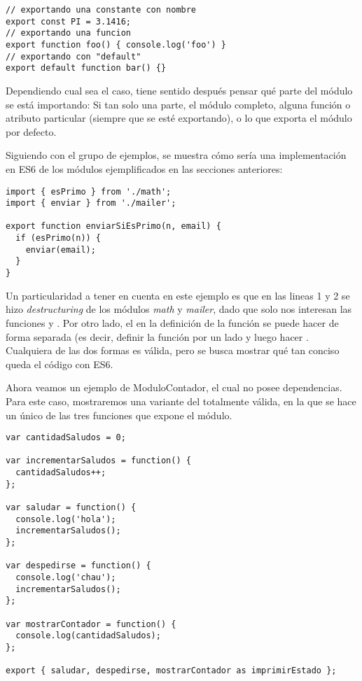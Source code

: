 \begin{lstlisting}[title={Algunos ejemplos de \code{export}}]
// exportando una constante con nombre
export const PI = 3.1416;
// exportando una funcion
export function foo() { console.log('foo') }
// exportando con "default"
export default function bar() {}
\end{lstlisting}

Dependiendo cual sea el caso, tiene sentido después pensar qué parte del módulo se está importando: Si tan solo una parte, el módulo completo, alguna función o atributo particular (siempre que se esté exportando), o lo que exporta el módulo por defecto.

Siguiendo con el grupo de ejemplos, se muestra cómo sería una implementación en ES6 de los módulos ejemplificados en las secciones anteriores:

\begin{lstlisting}[title={Ejemplo de módulo en ES6}]
import { esPrimo } from './math';
import { enviar } from './mailer';

export function enviarSiEsPrimo(n, email) {
  if (esPrimo(n)) {
    enviar(email);
  }
}
\end{lstlisting}

Un particularidad a tener en cuenta en este ejemplo es que en las lineas 1 y 2 se hizo \textit{destructuring} de los módulos \textit{math} y \textit{mailer}, dado que solo nos interesan las funciones  y . Por otro lado, el  en la definición de la función se puede hacer de forma separada (es decir, definir la función por un lado y luego hacer . Cualquiera de las dos formas es válida, pero se busca mostrar qué tan conciso queda el código con ES6.

Ahora veamos un ejemplo de ModuloContador, el cual no posee dependencias. Para este caso, mostraremos una variante del  totalmente válida, en la que se hace un único  de las tres funciones que expone el módulo.

\begin{lstlisting}[title={Modulo contador en ES6}]
var cantidadSaludos = 0;

var incrementarSaludos = function() {
  cantidadSaludos++;
};

var saludar = function() {
  console.log('hola');
  incrementarSaludos();
};

var despedirse = function() {
  console.log('chau');
  incrementarSaludos();
};

var mostrarContador = function() {
  console.log(cantidadSaludos);
};

export { saludar, despedirse, mostrarContador as imprimirEstado };
\end{lstlisting}
